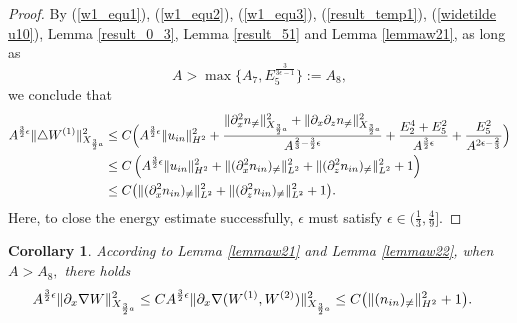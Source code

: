 \documentclass[12pt, reqno]{amsart}
\newtheorem{corollary}{Corollary}[section]
\numberwithin{equation}{section}
\begin{document}
\begin{proof}
		By (\ref{w1_equ1}), (\ref{w1_equ2}), (\ref{w1_equ3}), (\ref{result_temp1}), (\ref{widetilde u10}), Lemma \ref{result_0_3}, Lemma \ref{result_51} and Lemma \ref{lemmaw21}, as long as 
		$$A>\max\{A_7,E_5^{\frac{3}{3\epsilon-1}}\}:=A_8,$$
		we conclude that 
		\begin{equation*}
			\begin{aligned}
				A^{\frac32\epsilon}\|\triangle W^{(1)}\|^2_{X_{\frac32a}}
				&\leq C\Big(A^{\frac32\epsilon}\| u_{\rm in}\|^2_{H^2}
				+\frac{\|\partial_x^2n_{\neq}\|^2_{X_{\frac32a}}
					+\|\partial_x\partial_zn_{\neq}\|^2_{X_{\frac32a}} }{A^{\frac23-\frac32\epsilon}} 
				+\frac{E_2^4+E_5^2}{A^{\frac32\epsilon}}
				+\frac{E_5^2}{A^{2\epsilon-\frac23}}\Big)\\
				&\leq C\left(A^{\frac32\epsilon}\| u_{\rm in}\|^2_{H^2}+\|(\partial_x^2n_{\rm in})_{\neq}\|^2_{L^2}
				+
				\|(\partial_z^2n_{\rm in})_{\neq}\|^2_{L^2}
				+1\right)\\
				&\leq C\big(\|(\partial_x^2n_{\rm in})_{\neq}\|^2_{L^2}
				+\|(\partial_z^2n_{\rm in})_{\neq}\|^2_{L^2}+1\big).
			\end{aligned}
		\end{equation*}
		Here, to close the energy estimate successfully, $\epsilon$ must satisfy 
		$\epsilon\in(\frac13,\frac49]$.
	\end{proof}
	
	
	\begin{corollary}\label{c1}
		According to Lemma \ref{lemmaw21} and Lemma \ref{lemmaw22}, 
		when $A>A_8,$
		there holds 
		\begin{equation*}
			\begin{aligned}
				A^{\frac32\epsilon}\|\partial_x\nabla W\|^2_{X_{\frac32a}}
				&\leq CA^{\frac32\epsilon}\|\partial_x\nabla (W^{(1)},W^{(2)})\|^2_{X_{\frac32a}}
				\leq C\big(\|(n_{\rm in})_{\neq}\|^2_{H^2}+1\big).		
			\end{aligned}
		\end{equation*} 
	\end{corollary}
	
\end{document}
